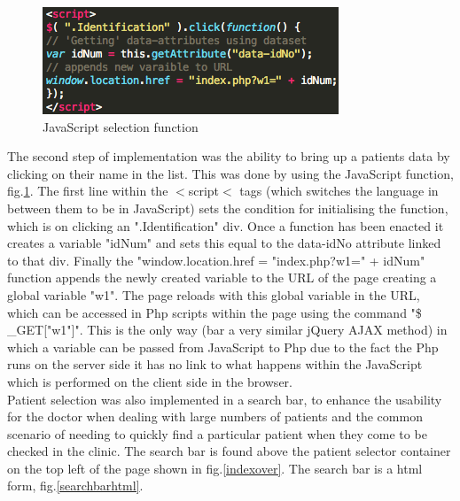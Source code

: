 \documentclass[11pt]{article}
\begin{document}
\begin{figure}
\centering
\includegraphics[scale=0.5]{selectfunc.png}
\caption{JavaScript selection function \label{selectfunc}} 
\end{figure}
The second step of implementation was the ability to bring up a patients data by clicking on their name in the list. This was done by using the JavaScript function, fig.\ref{selectfunc}. The first line within the $<$script$<$ tags (which switches the language in between them to be in JavaScript) sets the condition for initialising the function, which is on clicking an ".Identification" div. Once a function has been enacted it creates a variable "idNum" and sets this equal to the data-idNo attribute linked to that div. Finally the "window.location.href = "index.php?w1=" + idNum" function appends the newly created variable to the URL of the page creating a global variable "w1". The page reloads with this global variable in the URL, which can be accessed in Php scripts within the page using the command "\$ \_GET["w1"]". This is the only way (bar a very similar jQuery AJAX method) in which a variable can be passed from JavaScript to Php due to the fact the Php runs on the server side it has no link to what happens within the JavaScript which is performed on the client side in the browser. 
\\ \indent
Patient selection was also implemented in a search bar, to enhance the usability for the doctor when dealing with large numbers of patients and the common scenario of needing to quickly find a particular patient when they come to be checked in the clinic. The search bar is found above the patient selector container on the top left of the page shown in fig.\ref{indexover}. The search bar is a html form, fig.\ref{searchbarhtml}. 
\end{document}
